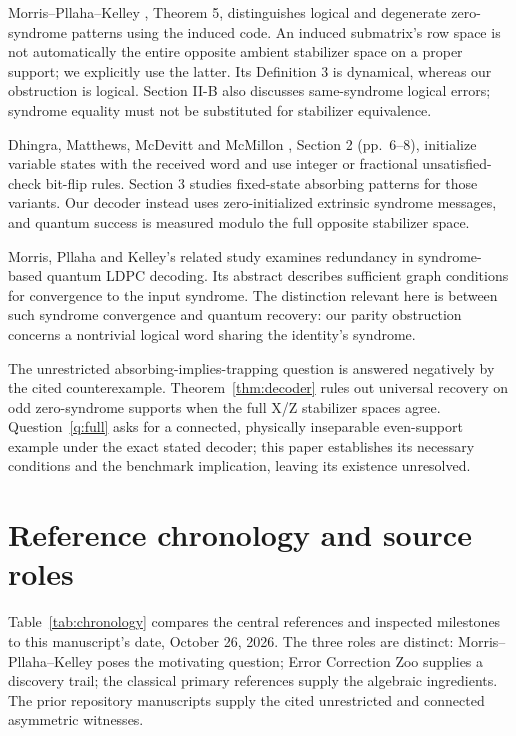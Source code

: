 \documentclass[11pt]{article}
\begin{document}
Morris--Pllaha--Kelley \cite{mpk}, Theorem 5, distinguishes logical and degenerate zero-syndrome patterns using the induced code. An induced submatrix's row space is not automatically the entire opposite ambient stabilizer space on a proper support; we explicitly use the latter. Its Definition 3 is dynamical, whereas our obstruction is logical. Section II-B also discusses same-syndrome logical errors; syndrome equality must not be substituted for stabilizer equivalence.

Dhingra, Matthews, McDevitt and McMillon \cite{dhingra}, Section 2 (pp.~6--8), initialize variable states with the received word and use integer or fractional unsatisfied-check bit-flip rules. Section 3 studies fixed-state absorbing patterns for those variants. Our decoder instead uses zero-initialized extrinsic syndrome messages, and quantum success is measured modulo the full opposite stabilizer space.

Morris, Pllaha and Kelley's related study \cite{redundancy} examines redundancy in syndrome-based quantum LDPC decoding. Its abstract describes sufficient graph conditions for convergence to the input syndrome. The distinction relevant here is between such syndrome convergence and quantum recovery: our parity obstruction concerns a nontrivial logical word sharing the identity's syndrome.

The unrestricted absorbing-implies-trapping question is answered negatively by the cited counterexample. Theorem~\ref{thm:decoder} rules out universal recovery on odd zero-syndrome supports when the full X/Z stabilizer spaces agree. Question~\ref{q:full} asks for a connected, physically inseparable even-support example under the exact stated decoder; this paper establishes its necessary conditions and the benchmark implication, leaving its existence unresolved.

\clearpage
\section{Reference chronology and source roles}\label{sec:chronology}
Table~\ref{tab:chronology} compares the central references and inspected milestones to this manuscript's date, October 26, 2026. The three roles are distinct: Morris--Pllaha--Kelley poses the motivating question; Error Correction Zoo supplies a discovery trail; the classical primary references supply the algebraic ingredients. The prior repository manuscripts supply the cited unrestricted and connected asymmetric witnesses.
\end{document}
